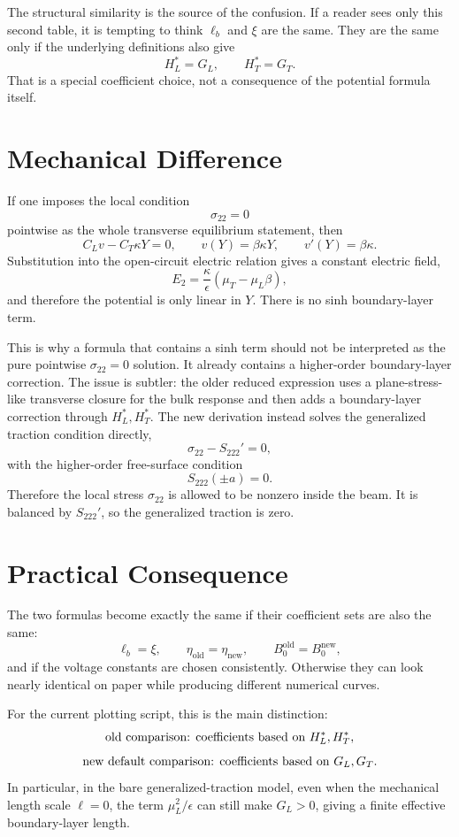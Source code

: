 \documentclass[11pt]{article}
\begin{document}
The structural similarity is the source of the confusion.  If a reader sees only
this second table, it is tempting to think \(\ell_b\) and \(\xi\) are the same.
They are the same only if the underlying definitions also give
\[
  H_L^*=G_L,\qquad H_T^*=G_T.
\]
That is a special coefficient choice, not a consequence of the potential formula
itself.

\section{Mechanical Difference}

If one imposes the local condition
\[
  \sigma_{22}=0
\]
pointwise as the whole transverse equilibrium statement, then
\[
  C_L v-C_T\kappa Y=0,
  \qquad
  v(Y)=\beta\kappa Y,
  \qquad
  v'(Y)=\beta\kappa .
\]
Substitution into the open-circuit electric relation gives a constant electric
field,
\[
  E_2
  =
  \frac{\kappa}{\epsilon}
  \left(\mu_T-\mu_L\beta\right),
\]
and therefore the potential is only linear in \(Y\).  There is no sinh
boundary-layer term.

This is why a formula that contains a sinh term should not be interpreted as the
pure pointwise \(\sigma_{22}=0\) solution.  It already contains a higher-order
boundary-layer correction.  The issue is subtler: the older reduced expression
uses a plane-stress-like transverse closure for the bulk response and then adds a
boundary-layer correction through \(H_L^*,H_T^*\).  The new derivation instead
solves the generalized traction condition directly,
\begin{equation}
  \sigma_{22}-S_{222}'=0,
  \label{eq:generalized-traction}
\end{equation}
with the higher-order free-surface condition
\begin{equation}
  S_{222}(\pm a)=0 .
\end{equation}
Therefore the local stress \(\sigma_{22}\) is allowed to be nonzero inside the
beam.  It is balanced by \(S_{222}'\), so the generalized traction is zero.

\section{Practical Consequence}

The two formulas become exactly the same if their coefficient sets are also the
same:
\[
  \ell_b=\xi,\qquad
  \eta_{\mathrm{old}}=\eta_{\mathrm{new}},\qquad
  B_0^{\mathrm{old}}=B_0^{\mathrm{new}},
\]
and if the voltage constants are chosen consistently.  Otherwise they can look
nearly identical on paper while producing different numerical curves.

For the current plotting script, this is the main distinction:
\[
  \hbox{old comparison: coefficients based on } H_L^*,H_T^*,
\]
\[
  \hbox{new default comparison: coefficients based on } G_L,G_T.
\]
In particular, in the bare generalized-traction model, even when the mechanical
length scale \(\ell=0\), the term \(\mu_L^2/\epsilon\) can still make
\(G_L>0\), giving a finite effective boundary-layer length.
\end{document}
